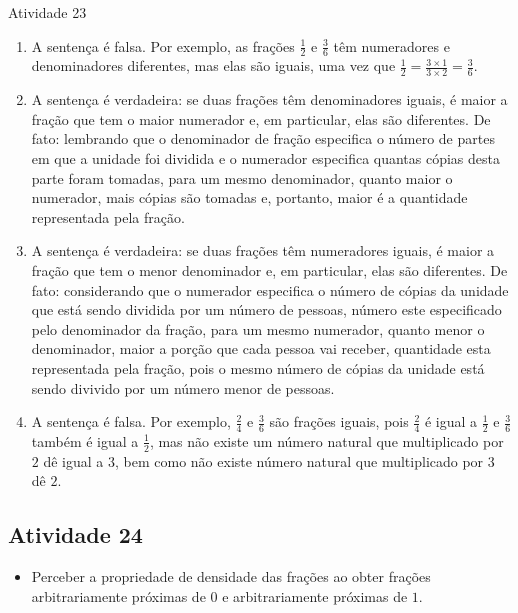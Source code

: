 \begin{multicols}{2}
\begin{resposta*}{Atividade 23}
\begin{enumerate} [\quad a)] %
    \item A sentença é falsa. Por exemplo, as frações $\frac{1}{2}$ e
$\frac{3}{6}$ têm numeradores e denominadores diferentes, mas elas são iguais,
uma vez que $\frac{1}{2} = \frac{3 \times 1}{3 \times 2} = \frac{3}{6}$.
    \item A sentença é verdadeira: se duas frações têm denominadores iguais, é
maior a fração que tem o maior numerador e, em particular, elas são diferentes.
De fato: lembrando que o denominador de fração especifica o número de partes em
que a unidade foi dividida e o numerador especifica quantas cópias desta parte
foram tomadas, para um mesmo denominador, quanto maior o numerador, mais cópias
são tomadas e, portanto, maior é a quantidade representada pela fração.
    \item  A sentença é verdadeira: se duas frações têm numeradores iguais, é
maior a fração que tem o menor denominador e, em particular, elas são
diferentes. De fato: considerando que o numerador especifica o número de cópias
da unidade que está sendo dividida por um número de pessoas, número este
especificado pelo denominador da fração, para um mesmo numerador, quanto menor o
denominador, maior a porção que cada pessoa vai receber, quantidade esta
representada pela fração, pois o mesmo número de cópias da unidade está sendo
divivido por um número menor de pessoas.
    \item A sentença é falsa. Por exemplo, $\frac{2}{4}$ e $\frac{3}{6}$ são
frações iguais, pois $\frac{2}{4}$ é igual a $\frac{1}{2}$ e $\frac{3}{6}$
também é igual a $\frac{1}{2}$, mas não existe um número natural que
multiplicado por $2$ dê igual a $3$, bem como não existe número natural que
multiplicado por $3$ dê $2$.
\end{enumerate}
\end{resposta*}

\subsection{Atividade 24}

\begin{itemize} %
    \item       Perceber a propriedade de densidade das frações ao obter frações
arbitrariamente próximas de       $0$       e arbitrariamente próximas de
$1$.
\end{itemize} %



\end{multicols}
